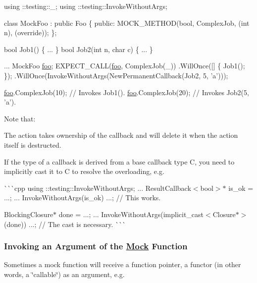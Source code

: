 \begin{DoxyCode}
using ::testing::\_;
using ::testing::InvokeWithoutArgs;

\textcolor{keyword}{class }MockFoo : \textcolor{keyword}{public} Foo \{
 \textcolor{keyword}{public}:
  MOCK\_METHOD(\textcolor{keywordtype}{bool}, ComplexJob, (\textcolor{keywordtype}{int} n), (\textcolor{keyword}{override}));
\};

\textcolor{keywordtype}{bool} Job1() \{ ... \}
\textcolor{keywordtype}{bool} Job2(\textcolor{keywordtype}{int} n, \textcolor{keywordtype}{char} c) \{ ... \}

...
  MockFoo \mbox{\hyperlink{namespacefoo}{foo}};
  EXPECT\_CALL(\mbox{\hyperlink{namespacefoo}{foo}}, ComplexJob(\_))
      .WillOnce([] \{ Job1(); \});
      .WillOnce(InvokeWithoutArgs(NewPermanentCallback(Job2, 5, \textcolor{charliteral}{'a'})));

  \mbox{\hyperlink{namespacefoo}{foo}}.ComplexJob(10);  \textcolor{comment}{// Invokes Job1().}
  \mbox{\hyperlink{namespacefoo}{foo}}.ComplexJob(20);  \textcolor{comment}{// Invokes Job2(5, 'a').}
\end{DoxyCode}


Note that\+:


\begin{DoxyItemize}
\item The action takes ownership of the callback and will delete it when the action itself is destructed.
\item If the type of a callback is derived from a base callback type {\ttfamily C}, you need to implicitly cast it to {\ttfamily C} to resolve the overloading, e.\+g.

\`{}\`{}\`{}cpp using \+::testing\+::\+Invoke\+Without\+Args; ... Result\+Callback$<$bool$>$$\ast$ is\+\_\+ok = ...; ... Invoke\+Without\+Args(is\+\_\+ok) ...; // This works.

Blocking\+Closure$\ast$ done = ...; ... Invoke\+Without\+Args(implicit\+\_\+cast$<$\+Closure$\ast$$>$(done)) ...; // The cast is necessary. \`{}\`{}\`{}
\end{DoxyItemize}

\subsubsection*{Invoking an Argument of the \mbox{\hyperlink{classMock}{Mock}} Function}

Sometimes a mock function will receive a function pointer, a functor (in other words, a \char`\"{}callable\char`\"{}) as an argument, e.\+g.


